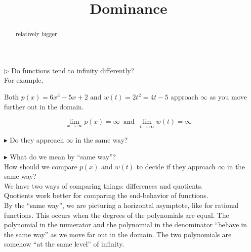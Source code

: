 \documentclass{ximera}
\title{Dominance}
\begin{document}
\begin{abstract}
relatively bigger
\end{abstract}
\maketitle







\textbf{\textcolor{red!70!black}{$\rhd$}} Do functions tend to infinity differently? \\



For example,

Both $p(x) = 6x^3 - 5x + 2$ and $w(t) = 2t^2 = 4t - 5$ approach $\infty$ as you move further out in the domain.



\[    \lim_{x \to \infty} p(x) = \infty  \, \text{ and }  \,       \lim_{t \to \infty} w(t) = \infty                \]

\textbf{\textcolor{blue!55!black}{$\blacktriangleright$}} Do they approach $\infty$ in the same way? 

\textbf{\textcolor{blue!55!black}{$\blacktriangleright$}} What do we mean by ``same way''?  \\



How should we compare $p(x)$ and $w(t)$ to decide if they approach $\infty$ in the same way?  \\


We have two ways of comparing things: differences and quotients. \\

Quotients work better for comparing the end-behavior of functions. \\


By the ``same way'', we are picturing a horizontal asymptote, like for rational functions. This occurs when the degrees of the polynomials are equal.   The polynomial in the numerator and the polynomial in the denominator ``behave in the same way'' as we move far out in the domain.  The two polynomials are somehow ``at the same level'' of infinity. \\
\end{document}
